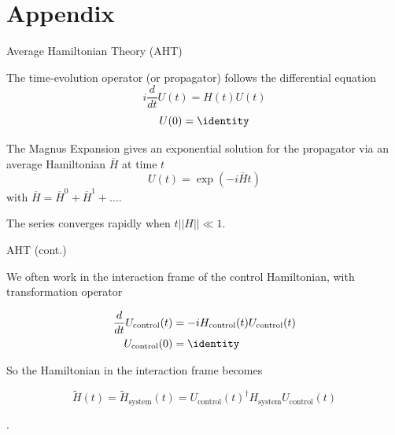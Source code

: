 \documentclass{beamer}
\begin{document}
\section{Appendix}

\begin{frame}{Average Hamiltonian Theory (AHT)}

The time-evolution operator (or propagator) follows the differential
equation \[
i \frac{d}{dt} U(t) = H(t)U(t)
\] \[
U(0) = \identity
\]

The Magnus Expansion gives an exponential solution for the propagator
via an average Hamiltonian \(\overline{H}\) at time \(t\) \[
U(t) = \exp\left( -i \overline{H} t \right)
\] with \(\overline{H} = \overline{H}^0 + \overline{H}^1 + \dots\).

The series converges rapidly when \(t||H|| \ll 1\).

\end{frame}

\begin{frame}{AHT (cont.)}

We often work in the interaction frame of the control Hamiltonian, with transformation operator

\begin{align*}
    \frac{d}{dt} U_\text{control}(t) &=
        -i H_\text{control}(t)U_\text{control}(t) \\
    U_\text{control}(0) &= \identity
\end{align*}

So the Hamiltonian in the interaction frame becomes

\begin{equation*}
    \widetilde{H}(t) = \widetilde{H}_\text{system}(t) = U_\text{control}(t)^\dagger H_\text{system} U_\text{control}(t)
\end{equation*}

\cite{brinkmann_2016}.
\end{frame}
\end{document}
